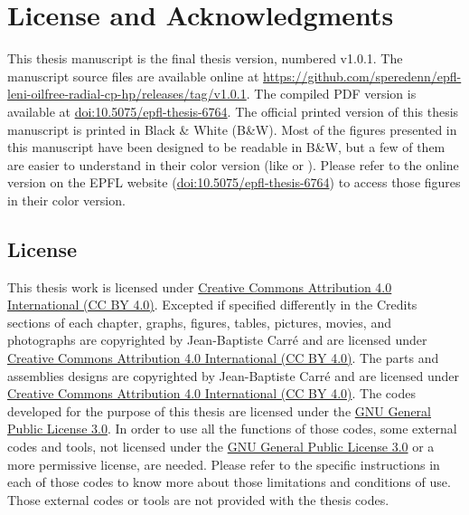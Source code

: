 \chapter{License and Acknowledgments}
\label{chap:licenses}

This thesis manuscript is the final thesis version, numbered
v1.0.1. The manuscript source files are available online at
\href{https://github.com/speredenn/epfl-leni-oilfree-radial-cp-hp/releases/tag/v1.0.1}{https://github.com/speredenn/epfl-leni-oilfree-radial-cp-hp/releases/tag/v1.0.1}. The
compiled PDF version is available at
\href{http://dx.doi.org/10.5075/epfl-thesis-6764}{doi:10.5075/epfl-thesis-6764}. The
official printed version of this thesis manuscript is printed in Black
\& White (B\&W). Most of the figures presented in this manuscript have
been designed to be readable in B\&W, but a few of them are easier to
understand in their color version (like
 or
). Please refer to the
online version on the EPFL website
(\href{http://dx.doi.org/10.5075/epfl-thesis-6764}{doi:10.5075/epfl-thesis-6764})
to access those figures in their color version.

\section*{License}
\label{sec:licenses}

This thesis work is licensed under
\href{http://creativecommons.org/licenses/by/4.0/}{Creative Commons
  Attribution 4.0 International (CC BY
  4.0)}. Excepted
if specified differently in the Credits sections of each chapter,
graphs, figures, tables, pictures, movies, and photographs are
copyrighted by Jean-Baptiste Carré and are licensed under
\href{http://creativecommons.org/licenses/by/4.0/}{Creative Commons
  Attribution 4.0 International (CC BY 4.0)}. The parts and assemblies
designs are copyrighted by Jean-Baptiste Carré and are licensed under
\href{http://creativecommons.org/licenses/by/4.0/}{Creative Commons
  Attribution 4.0 International (CC BY 4.0)}. The codes developed for
the purpose of this thesis are licensed under the
\href{http://www.gnu.org/licenses/gpl.html}{GNU General Public License
  3.0}. In order to
use all the functions of those codes, some external codes and tools,
not licensed under the \href{http://www.gnu.org/licenses/gpl.html}{GNU
  General Public License 3.0} or a more permissive license, are
needed. Please refer to the specific instructions in each of those
codes to know more about those limitations and conditions of
use. Those external codes or tools are not provided with the thesis
codes.

